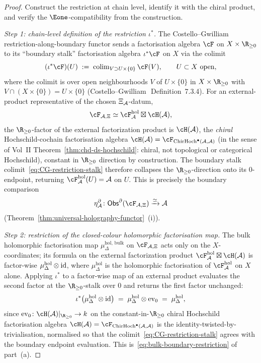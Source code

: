 \begin{proof}
Construct the restriction at chain level, identify it with the
chiral product, and verify the $\Eone$-compatibility from the
construction.

\emph{Step 1: chain-level definition of the restriction
$\iota^*$.}
The Costello--Gwilliam restriction-along-boundary functor sends a
factorisation algebra $\cF$ on $X \times \R_{\geq 0}$ to its
``boundary stalk'' factorisation algebra $\iota^*\cF$ on $X$ via
the colimit
\begin{equation}\label{eq:CG-restriction-stalk}
 (\iota^*\cF)(U)
 \;:=\;
 \mathrm{colim}_{V \supset U \times \{0\}}\,\cF(V),
 \qquad U \subset X \text{ open},
\end{equation}
where the colimit is over open neighbourhoods $V$ of
$U \times \{0\}$ in $X \times \R_{\geq 0}$ with $V \cap
(X \times \{0\}) = U \times \{0\}$
(Costello--Gwilliam~\cite{CG21}\,Definition~7.3.4). For an
external-product representative of the chosen \(\Xi_{\mathcal{A}}\)-datum,
\[
\cF_{\cA,\Xi}\simeq
\cF_\cA^{\mathrm{hol}} \boxtimes \cH(\cA),
\]
the
$\R_{\geq 0}$-factor of the external factorization product is
$\cH(\cA)$, the \emph{chiral} Hochschild-cochain factorisation algebra
$\cH(\cA) = \cF_{\ChirHoch^\bullet(\cA, \cA)}$
(in the sense of Vol~II Theorem~\ref{thm:chd-ds-hochschild}: chiral,
not topological or categorical Hochschild),
constant in $\R_{\geq 0}$ direction by construction. The
boundary stalk colimit~\eqref{eq:CG-restriction-stalk} therefore
collapses the $\R_{\geq 0}$-direction onto its $0$-endpoint,
returning $\cF_\cA^{\mathrm{hol}}(U) = \cA$ on $U$. This is precisely
the boundary comparison
\[
\eta^\partial_\cA\colon
\Obs^\partial(\cF_{\cA,\Xi})\xrightarrow{\simeq}\cA
\]
(Theorem~\ref{thm:universal-holography-functor}~(i)).

\emph{Step 2: restriction of the closed-colour holomorphic
factorisation map.}
The bulk holomorphic factorisation map
$\mu^{\mathrm{hol},\,\mathrm{bulk}}_\Delta$ on
\(\cF_{\cA,\Xi}\) acts only
on the $X$-coordinates; its formula on the external factorization
product $\cF_\cA^{\mathrm{hol}} \boxtimes \cH(\cA)$ is
factor-wise $\mu^{\mathrm{hol}}_\Delta \otimes \mathrm{id}$, where
$\mu^{\mathrm{hol}}_\Delta$ is the holomorphic factorisation of
$\cF_\cA^{\mathrm{hol}}$ on $X$ alone. Applying $\iota^*$ to a
factor-wise map of an external product evaluates the second factor
at the $\R_{\geq 0}$-stalk over $0$ and returns the first factor
unchanged:
\begin{equation}\label{eq:iota-pullback-external}
 \iota^*\bigl(\mu^{\mathrm{hol}}_\Delta \otimes \mathrm{id}\bigr)
 \;=\;
 \mu^{\mathrm{hol}}_\Delta \otimes \mathrm{ev}_0
 \;=\;
 \mu^{\mathrm{hol}}_\Delta,
\end{equation}
since $\mathrm{ev}_0 \colon \cH(\cA)|_{\R_{\geq 0}} \to k$ on the
constant-in-$\R_{\geq 0}$ chiral Hochschild factorisation algebra
$\cH(\cA) = \cF_{\ChirHoch^\bullet(\cA,\cA)}$ is the
identity-twisted-by-trivialisation, normalised so that the
colimit~\eqref{eq:CG-restriction-stalk} agrees with the boundary
endpoint evaluation. This is~\eqref{eq:bulk-boundary-restriction}
of part~(a).


\end{proof}
